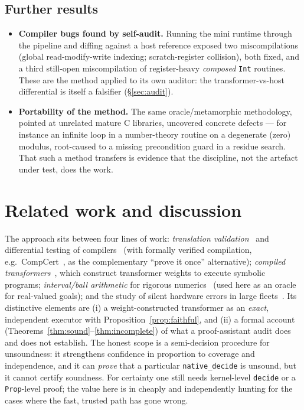 \documentclass[11pt]{article}
\theoremstyle{definition}
\theoremstyle{plain}
\theoremstyle{remark}
\begin{document}
\subsection{Further results}

\begin{itemize}[leftmargin=1.2em,itemsep=2pt]
\item \textbf{Compiler bugs found by self-audit.} Running the mini runtime through the pipeline and
      diffing against a host reference exposed two miscompilations (global read-modify-write indexing;
      scratch-register collision), both fixed, and a third still-open miscompilation of register-heavy
      \emph{composed} \texttt{Int} routines. These are the method applied to its own auditor: the
      transformer-vs-host differential is itself a falsifier (\S\ref{sec:audit}).
\item \textbf{Portability of the method.} The same oracle/metamorphic methodology, pointed at unrelated
      mature C libraries, uncovered concrete defects --- for instance an infinite loop in a
      number-theory routine on a degenerate (zero) modulus, root-caused to a missing precondition guard
      in a residue search. That such a method transfers is evidence that the discipline, not the
      artefact under test, does the work.
\end{itemize}

\section{Related work and discussion}

The approach sits between four lines of work: \emph{translation validation}~\cite{pnueli1998} and
differential testing of compilers~\cite{mckeeman1998,yang2011} (with formally verified compilation,
e.g.\ CompCert~\cite{leroy2009}, as the complementary ``prove it once'' alternative); \emph{compiled
transformers}~\cite{weiss2021,lindner2023,giannou2023}, which construct transformer weights to execute
symbolic programs; \emph{interval/ball arithmetic} for rigorous numerics~\cite{johansson2017} (used here
as an oracle for real-valued goals); and the study of silent hardware errors in large
fleets~\cite{hochschild2021,dixit2021}. Its distinctive elements are (i) a weight-constructed transformer as an
\emph{exact}, independent executor with Proposition~\ref{prop:faithful}, and (ii) a formal account
(Theorems~\ref{thm:sound}--\ref{thm:incomplete}) of what a proof-assistant audit does and does not
establish. The honest scope is a semi-decision procedure for unsoundness: it strengthens confidence in
proportion to coverage and independence, and it can \emph{prove} that a particular \texttt{native\_decide}
is unsound, but it cannot certify soundness. For certainty one still needs kernel-level \texttt{decide} or
a \texttt{Prop}-level proof; the value here is in cheaply and independently hunting for the cases where
the fast, trusted path has gone wrong.
\end{document}
